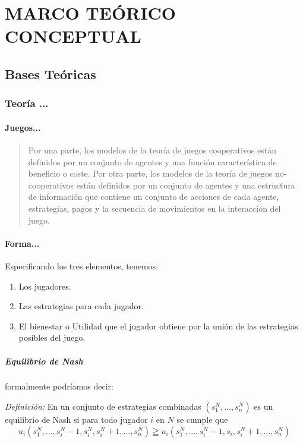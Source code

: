 	\chapter{MARCO TEÓRICO CONCEPTUAL}	
		\section{Bases Teóricas}
	
			\subsection{Teoría ...}	
				\subsubsection{Juegos...}
				
				\begin{quote}
					Por una parte, los modelos de la teoría de juegos cooperativos están definidos por un conjunto de agentes y una función característica de beneficio o coste. Por otra parte, los modelos de la teoría de juegos no-cooperativos están definidos por un conjunto de agentes y una estructura de información que contiene un conjunto de acciones de cada agente, estrategias, pagos y la secuencia de movimientos en la interacción del juego. \parencite[p. VI]{valencia-toledoBargainingModelsAsymmetric2017} 
				\end{quote}		
				
				\subsubsection{Forma...}
					
				Especificando los tres elementos, tenemos:
				\begin{enumerate}
					\item Los jugadores.
					\item Las estrategias para cada jugador.
					\item El bienestar o Utilidad que el jugador obtiene por la unión de las estrategias posibles del juego.
				\end{enumerate}	
				
					\paragraph{Equilibrio de Nash}
					
					formalmente podríamos decir:
					
					\textit{Definición:} En un conjunto de estrategias combinadas \((s^N_1,...,s^N_n)\) es un equilibrio de Nash si para todo jugador \(i\) en \(N\) se cumple que
					\[u_i(s^N_1,...,s^N_i-1,s^N_i,s^N_i+1,...,s^N_n)\geqq u_i(s^N_1,...,s^N_i-1,s_i,s^N_i+1,...,s^N_n)\]
			
